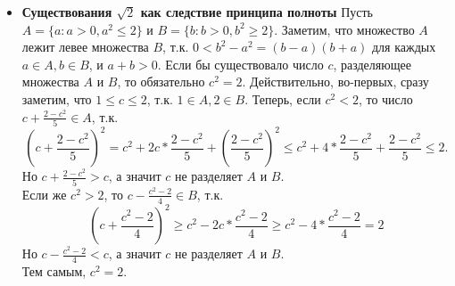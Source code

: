 \documentclass[12pt,a4paper]{article}
\begin{document}
\begin{itemize}
\item \textbf{Существования $\sqrt2$ как следствие принципа полноты}
Пусть $A=\{a: a > 0, a^2 \leq 2\}$ и $B = \{b: b > 0, b^2 \geq 2\}$. Заметим, что множество $A$ лежит левее множества $B$, т.к. $0 < b^2 - a^2 = (b-a)(b+a)$ для каждых $a \in A, b \in B$, и $a + b > 0$. Если бы существовало число $c$, разделяющее множества $A$ и $B$, то обязательно $c^2 = 2$. Действительно, во-первых, сразу заметим, что $1 \leq c \leq 2$, т.к. $1 \in A, 2 \in B$. Теперь, если $c^2 < 2$, то число $c + \frac{2 - c^2}{5} \in A$, т.к.
\[
(c + \frac{2 - c^2}{5})^2 = c^2 + 2c*\frac{2 - c^2}{5} + (\frac{2 - c^2}{5})^2 \leq c^2 + 4*\frac{2 - c^2}{5} + \frac{2 - c^2}{5} \leq 2.
\]
Но $c+\frac{2-c^2}{5} > c$, а значит $c$ не разделяет $A$ и $B$.\\
Если же $c^2 > 2$, то $c - \frac{c^2-2}{4} \in B$, т.к.
\[
(c + \frac{c^2 - 2}{4})^2 \geq c^2 - 2c*\frac{c^2-2}{4} \geq c^2 - 4 * \frac{c^2 - 2}{4} = 2
\]
Но $c - \frac{c^2 - 2}{4} < c$, а значит $c$ не разделяет $A$ и $B$. \\
Тем самым, $c^2 = 2$.
 
\end{itemize}
\end{document}
